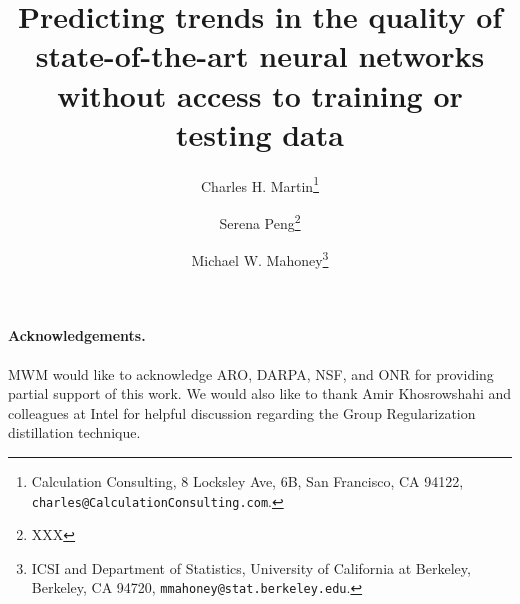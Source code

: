 \documentclass[11pt]{article}
\begin{document}
\title{%
Predicting trends in the quality of state-of-the-art neural networks without access to training or testing data
}

\author{%
Charles H. Martin\thanks{Calculation Consulting, 8 Locksley Ave, 6B, San Francisco, CA 94122, \texttt{charles@CalculationConsulting.com}.} 
\and 
Serena Peng\thanks{XXX}
\and
Michael W. Mahoney\thanks{ICSI and Department of Statistics, University of California at Berkeley, Berkeley, CA 94720, \texttt{mmahoney@stat.berkeley.edu}.}
}

\date{}
\maketitle



\begin{abstract}

\end{abstract}










\noindent
\paragraph{Acknowledgements.}
MWM would like to acknowledge ARO, DARPA, NSF, and ONR for providing partial support of this work.
We would also like to thank Amir Khosrowshahi and colleagues at Intel for helpful discussion regarding the Group Regularization distillation technique.


%
{\small
%
%

}

\appendix

\end{document}
